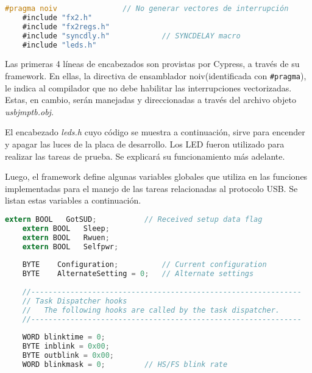 	\begin{lstlisting}[language=C,backgroundcolor=\color{gray!30}]
	#pragma noiv               // No generar vectores de interrupción
	#include "fx2.h"
	#include "fx2regs.h"
	#include "syncdly.h"            // SYNCDELAY macro
	#include "leds.h"
	\end{lstlisting}
	
	Las primeras 4 líneas de encabezados son provistas por Cypress, a través de su framework. En ellas, la directiva de ensamblador noiv(identificada con \verb|#pragma|), le indica al compilador que no debe habilitar las interrupciones vectorizadas. Estas, en cambio, serán manejadas y direccionadas a través del archivo objeto {\it usbjmptb.obj}.%
	
	El encabezado {\it leds.h} cuyo código se muestra a continuación, sirve para encender y apagar las luces de la placa de desarrollo. Los LED fueron utilizado para realizar las tareas de prueba. Se explicará su funcionamiento más adelante.%
	
	
	Luego, el framework define algunas variables globales que utiliza en las funciones implementadas para el manejo de las tareas relacionadas al protocolo USB. Se listan estas variables a continuación.
	
	\begin{lstlisting}[language=C,backgroundcolor=\color{gray!30}]
	extern BOOL   GotSUD;			// Received setup data flag
	extern BOOL   Sleep;
	extern BOOL   Rwuen;
	extern BOOL   Selfpwr;
	
	BYTE    Configuration;      	// Current configuration
	BYTE    AlternateSetting = 0;   // Alternate settings
	
	//--------------------------------------------------------------
	// Task Dispatcher hooks
	//   The following hooks are called by the task dispatcher.
	//--------------------------------------------------------------
	
	WORD blinktime = 0;
	BYTE inblink = 0x00;
	BYTE outblink = 0x00;
	WORD blinkmask = 0;			// HS/FS blink rate
	\end{lstlisting}
	
